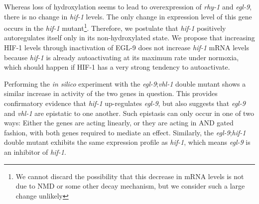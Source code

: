 \documentclass[9pt,twocolumn,twoside]{pnas-new}
\newcommand{\egl}{\emph{egl-9}}
\newcommand{\rhy}{\emph{rhy-1}}
\newcommand{\vhl}{\emph{vhl-1}}
\newcommand{\hif}{\emph{hif-1}}
\newcommand{\eglp}{EGL-9}
\newcommand{\hifp}{HIF-1}
\begin{document}
Whereas loss of hydroxylation seems to lead to overexpression of \rhy{} and \egl{}, there is no change in \hif{} levels. The only change in expression level of this gene occurs in the \hif{} mutant\footnote{We cannot discard the possibility that this decrease in mRNA levels is not due to NMD or some other decay mechanism, but we consider such a large change unlikely}. Therefore, we postulate that \hif{} positively autoregulates itself only in its non-hydroxylated state. We propose that increasing \hifp{} levels through inactivation of \eglp{} does not increase \hif{} mRNA levels because \hif{} is already autoactivating at its maximum rate under normoxia, which should happen if \hifp{} has a very strong tendency to autoactivate.

Performing the \emph{in silico} experiment with the \egl{};\vhl{} double mutant shows a similar increase in activity of the two genes in question.
This provides confirmatory evidence that \hif{} up-regulates \egl{}, but also suggests that \egl{} and \vhl{} are epistatic to one another. Such epistasis can only occur in one of two ways: Either the genes are acting linearly, or they are acting in AND gated fashion, with both genes required to mediate an effect. Similarly, the \egl{};\hif{} double mutant exhibits the same expression profile as \hif{}, which means \egl{} is an inhibitor of \hif{}.
\end{document}
